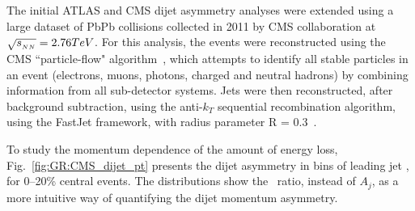 The initial ATLAS and CMS dijet asymmetry analyses were extended using a large dataset of PbPb collisions
collected in 2011 by CMS collaboration at $\sqrt{s_{_{NN}}}=2.76 TeV$. For this analysis, the events were 
reconstructed using the  CMS ``particle-flow" algorithm~\cite{CMS-PAS-PFT-10-002,MattPFlow}, 
which attempts to identify all stable particles in an
event (electrons, muons, photons, charged and neutral hadrons)
by combining information from all sub-detector systems.
Jets were then reconstructed, after background subtraction, using the anti-$k_T$ sequential recombination algorithm, 
using the {\mbox{FastJet}} framework, with radius parameter R = 0.3~\cite{Cacciari:2008gp}.

To study the momentum dependence of the amount of energy loss,
Fig.~\ref{fig:GR:CMS_dijet_pt} presents the dijet asymmetry in bins of leading jet
\pt, for 0--20\% central events. 
The distributions show the \ptrat\ ratio, instead of $A_j$,  as a more intuitive 
way of quantifying the dijet momentum asymmetry.

